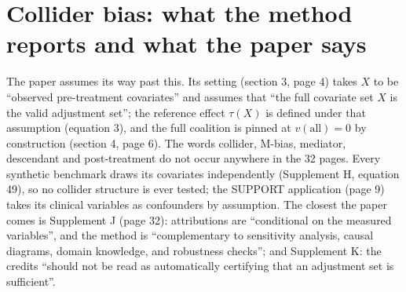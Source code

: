 \documentclass[10pt,letterpaper]{article}
\begin{document}
\section{Collider bias: what the method reports and what the paper says}
\label{sec:collider}
The paper assumes its way past this. Its setting (section 3, page 4) takes $X$ to be ``observed pre-treatment covariates'' and assumes that ``the full covariate set $X$ is the valid adjustment set''; the reference effect $\tau(X)$ is defined under that assumption (equation 3), and the full coalition is pinned at $v(\text{all}) = 0$ by construction (section 4, page 6). The words collider, M-bias, mediator, descendant and post-treatment do not occur anywhere in the 32 pages. Every synthetic benchmark draws its covariates independently (Supplement H, equation 49), so no collider structure is ever tested; the SUPPORT application (page 9) takes its clinical variables as confounders by assumption. The closest the paper comes is Supplement J (page 32): attributions are ``conditional on the measured variables'', and the method is ``complementary to sensitivity analysis, causal diagrams, domain knowledge, and robustness checks''; and Supplement K: the credits ``should not be read as automatically certifying that an adjustment set is sufficient''.
\end{document}
